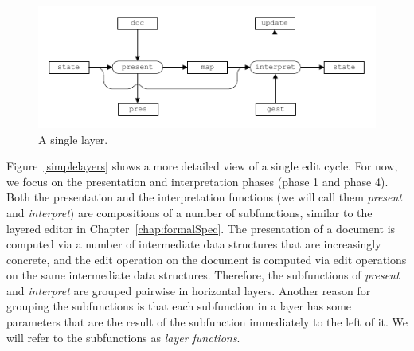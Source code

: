 \documentclass[preprint,natbib]{sigplanconf}
\begin{document}
\begin{figure}
\includegraphics[width=\columnwidth]{images/SingleLayer}
\caption{A single layer.}\label{simplesinglelayer} 
\end{figure}

\bc {}

Figure~\ref{simplelayers}  shows a more detailed view of a single edit cycle. For now, we focus on the presentation and interpretation phases (phase 1 and phase 4). Both the presentation and the interpretation functions (we will call them {\em present} and {\em interpret}) are compositions of a number of subfunctions, similar to the layered editor in Chapter~\ref{chap:formalSpec}. The presentation of a document is computed via a number of intermediate data structures that are increasingly concrete, and the edit operation on the document is computed via edit operations on the same intermediate data structures. Therefore, the subfunctions of {\em present} and {\em interpret} are grouped pairwise in horizontal layers. Another reason for grouping the subfunctions is that each subfunction in a layer has some parameters that are the result of the subfunction immediately to the left of it. We will refer to the subfunctions as {\em layer functions}. \ec


% 
\end{document}

